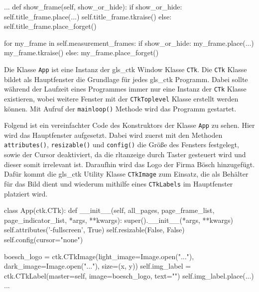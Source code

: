 \begin{pythoncode}
...
	def show_frame(self, show_or_hide):
		if show_or_hide:
			self.title_frame.place(...)
			self.title_frame.tkraise()
		else:
			self.title_frame.place_forget()
		
		for my_frame in self.measurement_frames:
			if show_or_hide:
				my_frame.place(...)
				my_frame.tkraise()
			else:
				my_frame.place_forget()
\end{pythoncode}

Die Klasse \lstinline{App} ist eine Instanz der \gls{gls_ctk} Window Klasse \lstinline{CTk}. Die \lstinline{CTk} Klasse bildet als Hauptfenster die Grundlage für jedes \gls{gls_ctk} Programm. Dabei sollte während der Laufzeit eines Programmes immer nur eine Instanz der \lstinline{CTk} Klasse existieren, wobei weitere Fenster mit der \lstinline{CTkToplevel} Klasse erstellt werden können. Mit Aufruf der \lstinline{mainloop()} Methode wird das Programm gestartet.
\cite[vgl.][]{Schimansky:o.J.} 

Folgend ist ein vereinfachter Code des Konstruktors der Klasse \lstinline{App} zu sehen. Hier wird das Hauptfenster aufgesetzt. Dabei wird zuerst mit den Methoden \lstinline{attributes()}, \lstinline{resizable()} und \lstinline{config()} die Größe des Fensters festgelegt, sowie der Cursor deaktiviert, da die \acs{rltanzeige} durch Taster gesteuert wird und dieser somit irrelevant ist. Daraufhin wird das Logo der Firma Bösch hinzugefügt. Dafür kommt die \gls{gls_ctk} Utility Klasse \lstinline{CTkImage} zum Einsatz, die als Behälter für das Bild dient und wiederum mithilfe eines \lstinline{CTkLabels} im Hauptfenster platziert wird.

\begin{pythoncode}
class App(ctk.CTk):
	def __init__(self, all_pages, page_frame_list, page_indicator_list, *args, **kwargs):
		super().__init__(*args, **kwargs)
		self.attributes('-fullscreen', True)
		self.resizable(False, False)
		self.config(cursor="none")
		
		boesch_logo = ctk.CTkImage(light_image=Image.open("..."), dark_image=Image.open("..."), size=(x, y))
		self.img_label = ctk.CTkLabel(master=self, image=boesch_logo, text="")
		self.img_label.place(...)
...
\end{pythoncode}


